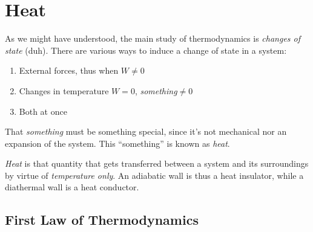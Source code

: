 \documentclass[../qm.tex]{subfiles}
\begin{document}
\chapter{Heat}
As we might have understood, the main study of thermodynamics is \textit{changes of state} (duh). There are various ways to induce a change of state in a system:
\begin{enumerate}
\item External forces, thus when $W\ne 0$
\item Changes in temperature $W=0$, \textit{something}$\ne0$
\item Both at once
\end{enumerate}
That \textit{something} must be something special, since it's not mechanical nor an expansion of the system. This ``something'' is known as \textit{heat}.
\begin{dfn}
	\emph{Heat} is that quantity that gets transferred between a system and its surroundings by virtue of \textit{temperature only}. An adiabatic wall is thus a heat insulator, while a diathermal wall is a heat conductor.
\end{dfn}
\section{First Law of Thermodynamics}
\end{document}
